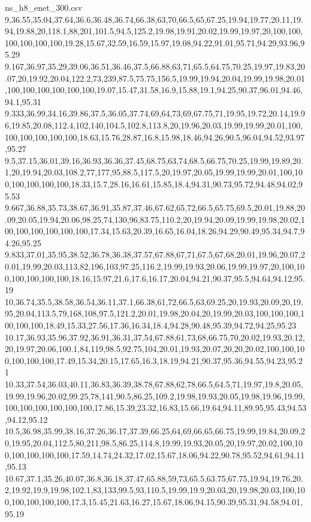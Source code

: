 \begin{filecontents*}[overwrite]{ns_h8_enet_300.csv}
9,36.55,35.04,37.64,36.6,36.48,36.74,66.38,63,70,66.5,65,67.25,19.94,19.77,20.11,19.94,19.88,20,118.1,88,201,101.5,94.5,125.2,19.98,19.91,20.02,19.99,19.97,20,100,100,100,100,100,100,19.28,15.67,32.59,16.59,15.97,19.08,94.22,91.01,95.71,94.29,93.96,95.29
9.167,36.97,35.29,39.06,36.51,36.46,37.5,66.88,63,71,65.5,64.75,70.25,19.97,19.83,20.07,20,19.92,20.04,122.2,73,239,87.5,75.75,156.5,19.99,19.94,20.04,19.99,19.98,20.01,100,100,100,100,100,100,19.07,15.47,31.58,16.9,15.88,19.1,94.25,90.37,96.01,94.46,94.1,95.31
9.333,36.99,34.16,39.86,37.5,36.05,37.74,69,64,73,69,67.75,71,19.95,19.72,20.14,19.96,19.85,20.08,112.4,102,140,104.5,102.8,113.8,20,19.96,20.03,19.99,19.99,20.01,100,100,100,100,100,100,18.63,15.76,28.87,16.8,15.98,18.46,94.26,90.5,96.04,94.52,93.97,95.27
9.5,37.15,36.01,39.16,36.93,36.36,37.45,68.75,63,74,68.5,66.75,70.25,19.99,19.89,20.1,20,19.94,20.03,108.2,77,177,95,88.5,117.5,20,19.97,20.05,19.99,19.99,20.01,100,100,100,100,100,100,18.33,15.7,28.16,16.61,15.85,18.4,94.31,90.73,95.72,94.48,94.02,95.53
9.667,36.88,35.73,38.67,36.91,35.87,37.46,67.62,65,72,66.5,65.75,69.5,20.01,19.88,20.09,20.05,19.94,20.06,98.25,74,130,96,83.75,110.2,20,19.94,20.09,19.99,19.98,20.02,100,100,100,100,100,100,17.34,15.63,20.39,16.65,16.04,18.26,94.29,90.49,95.34,94.7,94.26,95.25
9.833,37.01,35.95,38.52,36.78,36.38,37.57,67.88,67,71,67.5,67,68,20.01,19.96,20.07,20.01,19.99,20.03,113,82,196,103,97.25,116.2,19.99,19.93,20.06,19.99,19.97,20,100,100,100,100,100,100,18.16,15.97,21.6,17.6,16.17,20.04,94.21,90.37,95.5,94.64,94.12,95.19
10,36.74,35.5,38.58,36.54,36.11,37.1,66.38,61,72,66.5,63,69.25,20,19.93,20.09,20,19.95,20.04,113.5,79,168,108,97.5,121.2,20.01,19.98,20.04,20,19.99,20.03,100,100,100,100,100,100,18.49,15.33,27.56,17.36,16.34,18.4,94.28,90.48,95.39,94.72,94.25,95.23
10.17,36.93,35.96,37.92,36.91,36.31,37.54,67.88,61,73,68,66.75,70,20.02,19.93,20.12,20,19.97,20.06,100.1,84,119,98.5,92.75,104,20.01,19.93,20.07,20,20,20.02,100,100,100,100,100,100,17.49,15.34,20.15,17.65,16.3,18.19,94.21,90.37,95.36,94.55,94.23,95.21
10.33,37.54,36.03,40.11,36.83,36.39,38.78,67.88,62,78,66.5,64.5,71,19.97,19.8,20.05,19.99,19.96,20.02,99.25,78,141,90.5,86.25,109.2,19.98,19.93,20.05,19.98,19.96,19.99,100,100,100,100,100,100,17.86,15.39,23.32,16.83,15.66,19.64,94.11,89.95,95.43,94.53,94.12,95.12
10.5,36.98,35.99,38.16,37.26,36.17,37.39,66.25,64,69,66,65,66.75,19.99,19.84,20.09,20,19.95,20.04,112.5,80,211,98.5,86.25,114.8,19.99,19.93,20.05,20,19.97,20.02,100,100,100,100,100,100,17.59,14.74,24.32,17.02,15.67,18.06,94.22,90.78,95.52,94.61,94.11,95.13
10.67,37.1,35.26,40.07,36.8,36.18,37.47,65.88,59,73,65.5,63.75,67.75,19.94,19.76,20.2,19.92,19.9,19.98,102.1,83,133,99.5,93,110.5,19.99,19.9,20.03,20,19.98,20.03,100,100,100,100,100,100,17.3,15.45,21.63,16.27,15.67,18.06,94.15,90.39,95.31,94.58,94.01,95.19

\end{filecontents*}
